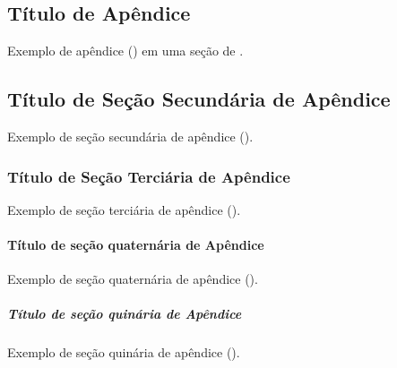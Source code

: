 
\begin{Appendix}

\section{Título de Apêndice}%
\label{sect:apx-a1}

Exemplo de apêndice () em uma seção de .

\subsection{Título de Seção Secundária de Apêndice}%
\label{ssect:apx-a2}

Exemplo de seção secundária de apêndice ().

\subsubsection{Título de Seção Terciária de Apêndice}%
\label{sssect:apx-a3}

Exemplo de seção terciária de apêndice ().

\paragraph{Título de seção quaternária de Apêndice}%
\label{prgh:apx-a4}

Exemplo de seção quaternária de apêndice ().

\subparagraph{Título de seção quinária de Apêndice}%
\label{sprgh:apx-a5}

Exemplo de seção quinária de apêndice ().

\end{Appendix}


